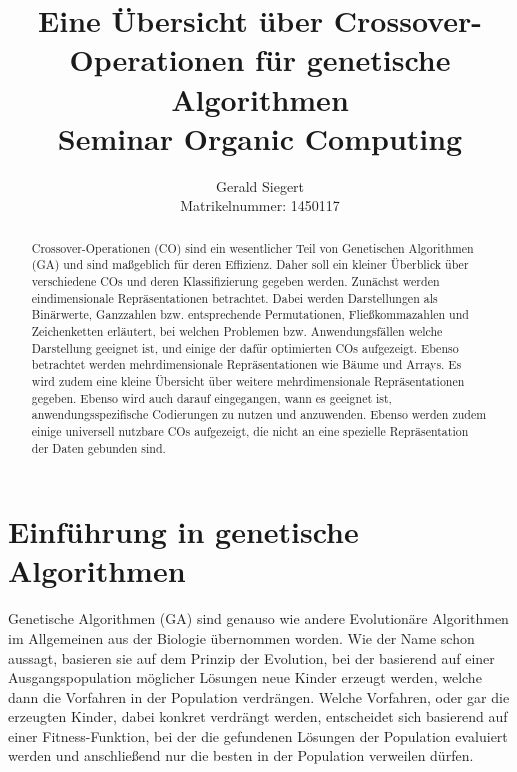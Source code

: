 \documentclass{llncs}
\begin{document}
\mainmatter

\title{Eine Übersicht über Crossover-Operationen für genetische Algorithmen\\Seminar Organic Computing}

\author{Gerald Siegert\\Matrikelnummer: 1450117}
\tocauthor{}


\maketitle


\begin{abstract}
	Crossover-Operationen (CO) sind ein wesentlicher Teil von Genetischen Algorithmen (GA) und sind maßgeblich für deren Effizienz. Daher soll ein kleiner Überblick über verschiedene COs und deren Klassifizierung gegeben werden. Zunächst werden eindimensionale Re\-prä\-sen\-ta\-ti\-on\-en betrachtet. Dabei werden Darstellungen als Binärwerte, Ganzzahlen bzw. entsprechende Permutationen, Fließkommazahlen und Zeichenketten erläutert, bei welchen Problemen bzw. Anwendungsfällen welche Darstellung geeignet ist, und einige der dafür optimierten COs aufgezeigt. Ebenso betrachtet werden mehrdimensionale Re\-prä\-sen\-ta\-ti\-on\-en wie Bäume und Arrays. Es wird zudem eine kleine Über\-sicht über weitere mehrdimensionale Repräsentationen gegeben. Ebenso wird auch darauf eingegangen, wann es geeignet ist, anwendungsspezifische Co\-die\-rungen zu nutzen und anzuwenden. Ebenso werden zudem einige universell nutzbare COs aufgezeigt, die nicht an eine spezielle Repräsentation der Daten gebunden sind.
\end{abstract}

\pagebreak

\section{Einführung in genetische Algorithmen}
\label{sec:EinfGA}

Genetische Algorithmen (GA) sind genauso wie andere Evolutionäre Algorithmen im Allgemeinen aus der Biologie übernommen worden. Wie der Name schon aussagt, basieren sie auf dem Prinzip der Evolution, bei der basierend auf einer Ausgangspopulation möglicher Lösungen neue Kinder erzeugt werden, welche dann die Vorfahren in der Population verdrängen. Welche Vorfahren, oder gar die erzeugten Kinder, dabei konkret verdrängt werden, entscheidet sich basierend auf einer Fitness-Funktion, bei der die gefundenen Lösungen der Population evaluiert werden und anschließend nur die besten in der Population verweilen dürfen.
\end{document}
